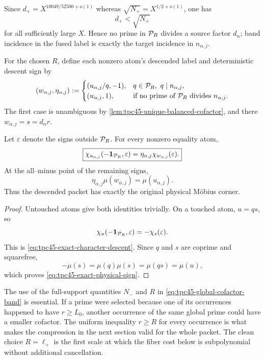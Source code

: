 Since \(d_+=X^{10049/52500+o(1)}\) whereas
\(\sqrt{N_+}=X^{1/2+o(1)}\), one has
\begin{equation}
 d_+<\sqrt{N_+}
 \label{eq:tpc45-source-below-band}
\end{equation}
for all sufficiently large \(X\).  Hence no prime in \(\mathcal P_R\) divides
a source factor \(d_\alpha\); band incidence in the fused label is
exactly the target incidence in \(n_{\alpha,j}\).

For the chosen \(R\), define each nonzero atom's descended label and
deterministic descent sign by
\begin{equation}
 (w_{\alpha,j},\eta_{\alpha,j})
 :=
 \begin{cases}
  (u_{\alpha,j}/q,-1),
   &q\in\mathcal P_R,\ q\mid n_{\alpha,j},\\
  (u_{\alpha,j},1),&
   \text{if no prime of \(\mathcal P_R\) divides \(n_{\alpha,j}\)}.
 \end{cases}
 \label{eq:tpc45-descended-label-sign}
\end{equation}
The first case is unambiguous by
\cref{lem:tpc45-unique-balanced-cofactor}, and there
\(w_{\alpha,j}=s=d_\alpha r\).

\begin{proposition}
\label{prop:tpc45-character-descent}
Let \(\varepsilon\) denote the signs outside \(\mathcal P_R\).  For
every nonzero equality atom,
\begin{equation}
 \boxed{
 \chi_{u_{\alpha,j}}
  (-\mathbf 1_{\mathcal P_R},\varepsilon)
 =\eta_{\alpha,j}\chi_{w_{\alpha,j}}(\varepsilon).}
 \label{eq:tpc45-exact-character-descent}
\end{equation}
At the all--minus point of the remaining signs,
\begin{equation}
 \eta_{\alpha,j}\mu(w_{\alpha,j})
 =\mu(u_{\alpha,j}).
 \label{eq:tpc45-exact-physical-sign}
\end{equation}
Thus the descended packet has exactly the original physical M\"obius
corner.
\end{proposition}

\begin{proof}
Untouched atoms give both identities trivially.  On a touched atom,
\(u=qs\), so
\[
 \chi_u(-\mathbf 1_{\mathcal P_R},\varepsilon)
 =-\chi_s(\varepsilon).
\]
This is \eqref{eq:tpc45-exact-character-descent}.  Since \(q\) and
\(s\) are coprime and squarefree,
\[
 -\mu(s)=\mu(q)\mu(s)=\mu(qs)=\mu(u),
\]
which proves \eqref{eq:tpc45-exact-physical-sign}.
\end{proof}

The use of the full-support quantities \(N_-\) and \(R\) in
\eqref{eq:tpc45-global-cofactor-band} is essential.  If a prime were selected
because one of its occurrences happened to have \(r\ge L_0\), another
occurrence of the same global prime could have a smaller cofactor.  The
uniform inequality \(r\ge R\) for every occurrence is what makes the
compression in the next section valid for the whole packet.  The clean
choice \(R=\ell_+\) is the first scale at which the fiber cost below is
subpolynomial without additional cancellation.
